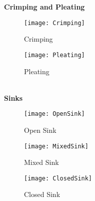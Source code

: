 \newpage
\textbf{Crimping and Pleating}
\begin{figure*}
	\centering
	\begin{subfigure}[h]{0.49\textwidth}
		\texttt{[image: Crimping]}
		\caption{Crimping}
		\label{fig:crimping}
	\end{subfigure}
	\begin{subfigure}[h]{0.49\textwidth}
		\texttt{[image: Pleating]}
		\caption{Pleating}
		\label{fig:pleating}
	\end{subfigure}
\end{figure*}
\\
\textbf{Sinks}
\begin{figure*}
	\centering
	\begin{subfigure}[h]{0.49\textwidth}
		\texttt{[image: OpenSink]}
		\caption{Open Sink}
		\label{fig:openSink}
	\end{subfigure}
	\begin{subfigure}[h]{0.49\textwidth}
		\texttt{[image: MixedSink]}
		\caption{Mixed Sink}
		\label{fig:mixedSink}
	\end{subfigure}
	\begin{subfigure}[h]{0.49\textwidth}
		\texttt{[image: ClosedSink]}
		\caption{Closed Sink}
		\label{fig:closedSink}
	\end{subfigure}
\end{figure*}









